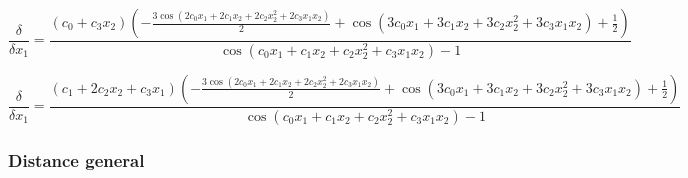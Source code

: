 \documentclass[10pt,a4paper]{article}
\begin{document}
\begin{equation}
\frac{\delta}{\delta x_1} =
\frac{\left(c_{0} + c_{3} x_{2}\right) \left(- \frac{3 \cos{\left (2 c_{0} x_{1} + 2 c_{1} x_{2} + 2 c_{2} x_{2}^{2} + 2 c_{3} x_{1} x_{2} \right )}}{2} + \cos{\left (3 c_{0} x_{1} + 3 c_{1} x_{2} + 3 c_{2} x_{2}^{2} + 3 c_{3} x_{1} x_{2} \right )} + \frac{1}{2}\right)}{\cos{\left (c_{0} x_{1} + c_{1} x_{2} + c_{2} x_{2}^{2} + c_{3} x_{1} x_{2} \right )} - 1}
\end{equation}

\begin{equation}
\frac{\delta}{\delta x_1} =
\frac{\left(c_{1} + 2 c_{2} x_{2} + c_{3} x_{1}\right) \left(- \frac{3 \cos{\left (2 c_{0} x_{1} + 2 c_{1} x_{2} + 2 c_{2} x_{2}^{2} + 2 c_{3} x_{1} x_{2} \right )}}{2} + \cos{\left (3 c_{0} x_{1} + 3 c_{1} x_{2} + 3 c_{2} x_{2}^{2} + 3 c_{3} x_{1} x_{2} \right )} + \frac{1}{2}\right)}{\cos{\left (c_{0} x_{1} + c_{1} x_{2} + c_{2} x_{2}^{2} + c_{3} x_{1} x_{2} \right )} - 1}
\end{equation}



\subsubsection{Distance general}
\end{document}
